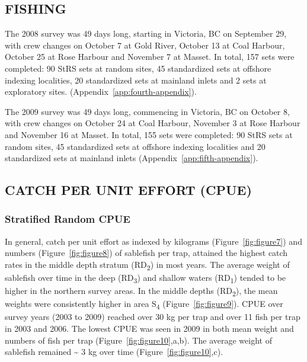 \documentclass[12pt]{article}\usepackage[]{graphicx}\usepackage[]{color}
\begin{document}
\hypertarget{fishing}{%
\subsection{FISHING}\label{fishing}}

The 2008 survey was 49 days long, starting in Victoria, BC on September 29, with crew changes on October 7 at Gold River, October 13 at Coal Harbour, October 25 at Rose Harbour and November 7 at Masset. In total, 157 sets were completed: 90 StRS sets at random sites, 45 standardized sets at offshore indexing localities, 20 standardized sets at mainland inlets and 2 sets at exploratory sites. (Appendix~\ref{app:fourth-appendix}).

The 2009 survey was 49 days long, commencing in Victoria, BC on October 8, with crew changes on October 24 at Coal Harbour, November 3 at Rose Harbour and November 16 at Masset. In total, 155 sets were completed: 90 StRS sets at random sites, 45 standardized sets at offshore indexing localities and 20 standardized sets at mainland inlets (Appendix~\ref{app:fifth-appendix}).

\hypertarget{catch-per-unit-effort-cpue}{%
\subsection{CATCH PER UNIT EFFORT (CPUE)}\label{catch-per-unit-effort-cpue}}

\hypertarget{stratified-random-cpue}{%
\subsubsection{Stratified Random CPUE}\label{stratified-random-cpue}}

In general, catch per unit effort as indexed by kilograms (Figure~\ref{fig:figure7}) and numbers (Figure~\ref{fig:figure8}) of sablefish per trap, attained the highest catch rates in the middle depth stratum (RD\textsubscript{2}) in most years. The average weight of sablefish over time in the deep (RD\textsubscript{3}) and shallow waters (RD\textsubscript{1}) tended to be higher in the northern survey areas. In the middle depths (RD\textsubscript{2}), the mean weights were consistently higher in area S\textsubscript{4} (Figure~\ref{fig:figure9}). CPUE over survey years (2003 to 2009) reached over 30 kg per trap and over 11 fish per trap in 2003 and 2006. The lowest CPUE was seen in 2009 in both mean weight and numbers of fish per trap (Figure~\ref{fig:figure10},a,b). The average weight of sablefish remained \textasciitilde{} 3 kg over time (Figure~\ref{fig:figure10},c).
\end{document}

